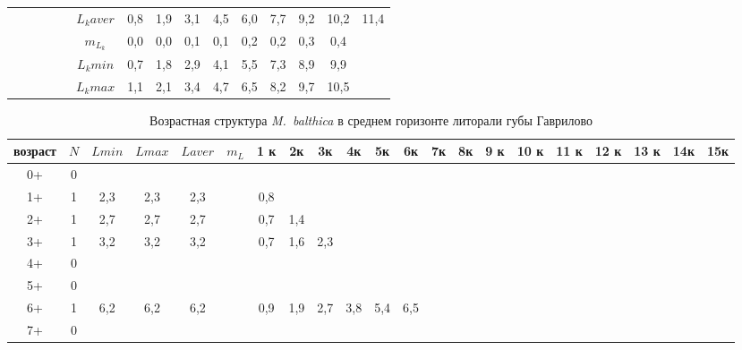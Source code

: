 \begin{landscape}
\begin{table}[h]
\begin{tabular}{|c|c|cc|cc|ccccccccc|}
        &    &       &       &         & $L_k aver$ & 0,8 & 1,9 & 3,1 & 4,5 & 6,0 & 7,7 & 9,2 & 10,2 & 11,4 \\
        &    &       &       &         & $m_{L_k}$  & 0,0 & 0,0 & 0,1 & 0,1 & 0,2 & 0,2 & 0,3 & 0,4  &      \\
        &    &       &       &         & $L_k min$  & 0,7 & 1,8 & 2,9 & 4,1 & 5,5 & 7,3 & 8,9 & 9,9  &      \\
        &    &       &       &         & $L_k max$  & 1,1 & 2,1 & 3,4 & 4,7 & 6,5 & 8,2 & 9,7 & 10,5 &      \\ \hline
\end{tabular}
\end{table}

\begin{table}[h]
\caption{Возрастная структура {\it M.~balthica} в среднем горизонте литорали губы Гаврилово}
\label{tab:Gavrilovo_sgl_growth_matrix}
\begin{tabular}{|c|c|cc|cc|ccccccccccccccc|}
    \hline
возраст & $N$ & $L min$ & $L max$ & $L aver$ & $m_L$   & 1 к & 2к  & 3к  & 4к  & 5к  & 6к  & 7к   & 8к   & 9 к  & 10 к & 11 к & 12 к & 13 к & 14к  & 15к  \\ \hline
0+      & 0 &       &       &         &         &     &     &     &     &     &     &      &      &      &      &      &      &      &      &      \\
1+      & 1 & 2,3   & 2,3   & 2,3     &         & 0,8 &     &     &     &     &     &      &      &      &      &      &      &      &      &      \\
2+      & 1 & 2,7   & 2,7   & 2,7     &         & 0,7 & 1,4 &     &     &     &     &      &      &      &      &      &      &      &      &      \\
3+      & 1 & 3,2   & 3,2   & 3,2     &         & 0,7 & 1,6 & 2,3 &     &     &     &      &      &      &      &      &      &      &      &      \\
4+      & 0 &       &       &         &         &     &     &     &     &     &     &      &      &      &      &      &      &      &      &      \\
5+      & 0 &       &       &         &         &     &     &     &     &     &     &      &      &      &      &      &      &      &      &      \\
6+      & 1 & 6,2   & 6,2   & 6,2     &         & 0,9 & 1,9 & 2,7 & 3,8 & 5,4 & 6,5 &      &      &      &      &      &      &      &      &      \\
7+      & 0 &       &       &         &         &     &     &     &     &     &     &      &      &      &      &      &      &      &      &      \\

\end{tabular}
\end{table}
\end{landscape}
